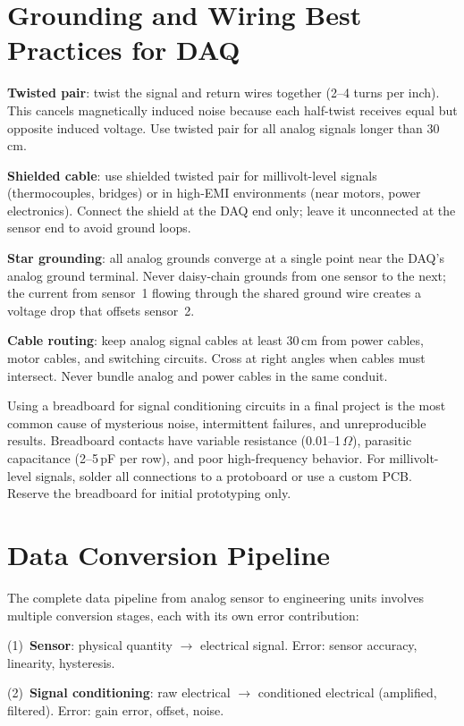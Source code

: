 \documentclass[11pt,letterpaper,twoside,openany]{book}
\begin{document}
\section{Grounding and Wiring Best Practices for DAQ}
\textbf{Twisted pair}: twist the signal and return wires together (2--4 turns per inch). This cancels magnetically induced noise because each half-twist receives equal but opposite induced voltage. Use twisted pair for all analog signals longer than 30\,cm.

\textbf{Shielded cable}: use shielded twisted pair for millivolt-level signals (thermocouples, bridges) or in high-EMI environments (near motors, power electronics). Connect the shield at the DAQ end only; leave it unconnected at the sensor end to avoid ground loops.

\textbf{Star grounding}: all analog grounds converge at a single point near the DAQ's analog ground terminal. Never daisy-chain grounds from one sensor to the next; the current from sensor~1 flowing through the shared ground wire creates a voltage drop that offsets sensor~2.

\textbf{Cable routing}: keep analog signal cables at least 30\,cm from power cables, motor cables, and switching circuits. Cross at right angles when cables must intersect. Never bundle analog and power cables in the same conduit.

\begin{warningbox}
Using a breadboard for signal conditioning circuits in a final project is the most common cause of mysterious noise, intermittent failures, and unreproducible results. Breadboard contacts have variable resistance (0.01--1\,$\Omega$), parasitic capacitance (2--5\,pF per row), and poor high-frequency behavior. For millivolt-level signals, solder all connections to a protoboard or use a custom PCB. Reserve the breadboard for initial prototyping only.
\end{warningbox}
\section{Data Conversion Pipeline}
The complete data pipeline from analog sensor to engineering units involves multiple conversion stages, each with its own error contribution:

(1)~\textbf{Sensor}: physical quantity $\to$ electrical signal. Error: sensor accuracy, linearity, hysteresis.

(2)~\textbf{Signal conditioning}: raw electrical $\to$ conditioned electrical (amplified, filtered). Error: gain error, offset, noise.
\end{document}
